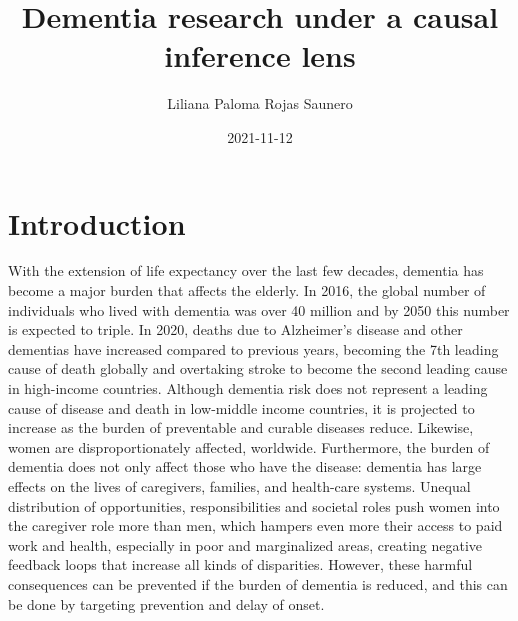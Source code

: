 \documentclass[
]{book}
\title{Dementia research under a causal inference lens}
\author{Liliana Paloma Rojas Saunero}
\date{2021-11-12}
\begin{document}
\maketitle

{
\setcounter{tocdepth}{1}
\tableofcontents
}
\hypertarget{intro}{%
\chapter{Introduction}\label{intro}}

With the extension of life expectancy over the last few decades, dementia has become a major burden that affects the elderly. In 2016, the global number of individuals who lived with dementia was over 40 million\autocite{gbd2016} and by 2050 this number is expected to triple\autocite{worldreport2018}. In 2020, deaths due to Alzheimer's disease and other dementias have increased compared to previous years, becoming the 7th leading cause of death globally and overtaking stroke to become the second leading cause in high-income countries. Although dementia risk does not represent a leading cause of disease and death in low-middle income countries, it is projected to increase as the burden of preventable and curable diseases reduce\autocite{who2020}. Likewise, women are disproportionately affected, worldwide\autocite{women2015}. Furthermore, the burden of dementia does not only affect those who have the disease: dementia has large effects on the lives of caregivers, families, and health-care systems. Unequal distribution of opportunities, responsibilities and societal roles push women into the caregiver role more than men, which hampers even more their access to paid work and health, especially in poor and marginalized areas, creating negative feedback loops that increase all kinds of disparities\autocite{swinkels2019,brodaty2009,etters2008}. However, these harmful consequences can be prevented if the burden of dementia is reduced, and this can be done by targeting prevention and delay of onset\autocite{carrillo2013}.
\end{document}
